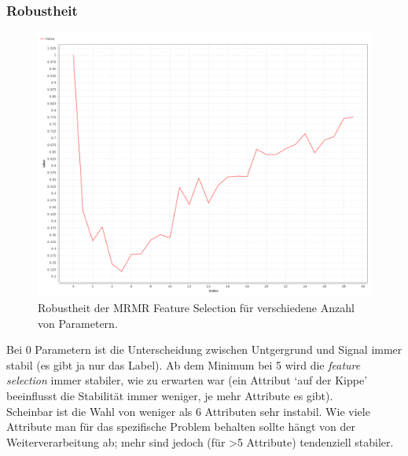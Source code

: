 \documentclass[12pt,ngerman,a4paperpaper,]{article}
\begin{document}
\subsubsection{Robustheit}\label{robustheit}

\begin{figure}
\centering
\includegraphics{aufg3/robustness.png}
\caption{Robustheit der MRMR Feature Selection für verschiedene Anzahl von Parametern.}
\end{figure}

Bei 0 Parametern ist die Unterscheidung zwischen Untgergrund und Signal
immer stabil (es gibt ja nur das Label). Ab dem Minimum bei 5 wird die
\emph{feature selection} immer stabiler, wie zu erwarten war (ein
Attribut `auf der Kippe' beeinflusst die Stabilität immer weniger, je
mehr Attribute es gibt).\\
Scheinbar ist die Wahl von weniger als 6 Attributen sehr instabil. Wie
viele Attribute man für das spezifische Problem behalten sollte hängt
von der Weiterverarbeitung ab; mehr sind jedoch (für \textgreater{}5
Attribute) tendenziell stabiler.
\end{document}
